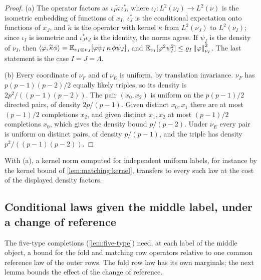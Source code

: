 \begin{proof}
(a) The operator factors as $\iota_I\widetilde\kappa\,\iota_J^*$, where
$\iota_I\colon L^2(\nu_I)\to L^2(\nu)$ is the isometric embedding of functions
of $x_I$, $\iota_J^*$ is the conditional expectation onto functions of $x_J$,
and $\widetilde\kappa$ is the operator with kernel $\kappa$ from $L^2(\nu_J)$ to
$L^2(\nu_I)$; since $\iota_I$ is isometric and $\iota_J^*\iota_J$ is the
identity, the norms agree. If $\psi_I$ is the
density of $\nu_I$, then
$\left\langle \varphi,\widetilde\kappa\phi\right\rangle=\mathbb E_{\upsilon_I\otimes\upsilon_J}[\varphi\psi_I\,
\kappa\,\phi\psi_J]$, and $\mathbb E_{\upsilon_I}[\varphi^2\psi_I^2]\le\varrho_I
\left\|\varphi\right\|_{\nu_I}^2$. The last statement is the case $I=J=\Lambda$.

(b) Every coordinate of $\nu_F$ and of $\nu_E$ is uniform, by translation
invariance. $\nu_F$ has $p(p-1)(p-2)/2$ equally likely triples, so its density
is $2p^2/((p-1)(p-2))$. The pair $(x_0,x_2)$ is uniform on the $p(p-1)/2$
directed pairs, of density $2p/(p-1)$. Given distinct $x_0,x_1$ there are at
most $(p-1)/2$ completions $x_2$, and given distinct $x_1,x_2$ at most
$(p-1)/2$ completions $x_0$, which gives the density bound $p/(p-2)$. Under
$\nu_E$ every pair is uniform on distinct pairs, of density $p/(p-1)$, and the
triple has density $p^2/((p-1)(p-2))$.
\end{proof}

With (a), a kernel norm computed for independent uniform labels, for instance
by the kernel bound of \cref{lem:matching:kernel},
transfers to every such law at the cost of the displayed density factors.

\subsection{Conditional laws given the middle label, under a change of reference}\label{subsec:cuts:rows}

The five-type completions (\cref{lem:five-type}) need, at each label of the
middle object, a bound for the fold and matching row operators relative to one
common reference law of the outer rows. The fold row law has its own
marginals; the next lemma bounds the effect of the change of reference.

